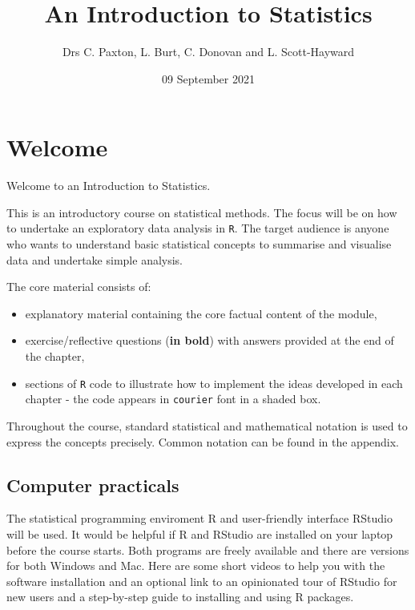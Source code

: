 \documentclass[
  oneside]{krantz}
\title{An Introduction to Statistics}
\author{Drs C. Paxton, L. Burt, C. Donovan and L. Scott-Hayward}
\date{09 September 2021}
\providecommand{\tightlist}{%
  \setlength{\itemsep}{0pt}\setlength{\parskip}{0pt}}
\begin{document}
\maketitle

{
\hypersetup{linkcolor=}
\setcounter{tocdepth}{2}
\tableofcontents
}
\hypertarget{welcome}{%
\chapter*{Welcome}\label{welcome}}


Welcome to an Introduction to Statistics.

This is an introductory course on statistical methods. The focus will be on how to undertake an exploratory data analysis in \texttt{R}. The target audience is anyone who wants to understand basic statistical concepts to summarise and visualise data and undertake simple analysis.

The core material consists of:

\begin{itemize}
\tightlist
\item
  explanatory material containing the core factual content of the module,
\item
  exercise/reflective questions (\textbf{in bold}) with answers provided at the end of the chapter,
\item
  sections of \texttt{R} code to illustrate how to implement the ideas developed in each chapter - the code appears in \texttt{courier} font in a shaded box.
\end{itemize}

Throughout the course, standard statistical and mathematical notation is used to express the concepts precisely. Common notation can be found in the appendix.

\hypertarget{computer-practicals}{%
\section*{Computer practicals}\label{computer-practicals}}


The statistical programming enviroment R and user-friendly interface RStudio will be used. It would be helpful if R and RStudio are installed on your laptop before the course starts. Both programs are freely available and there are versions for both Windows and Mac. Here are some short videos to help you with the software installation and an optional link to an opinionated tour of RStudio for new users and a step-by-step guide to installing and using R packages.
\end{document}
